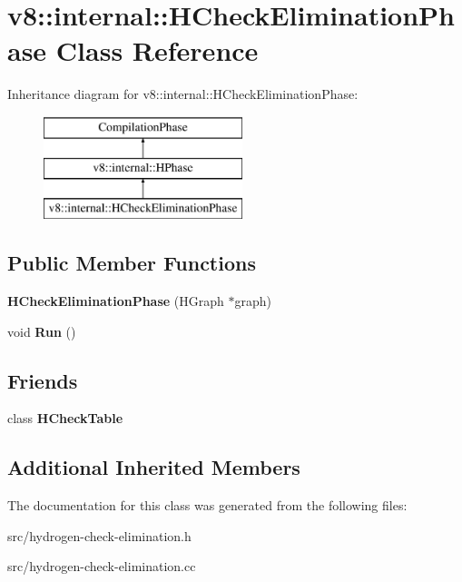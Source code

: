 \hypertarget{classv8_1_1internal_1_1_h_check_elimination_phase}{}\section{v8\+:\+:internal\+:\+:H\+Check\+Elimination\+Phase Class Reference}
\label{classv8_1_1internal_1_1_h_check_elimination_phase}
Inheritance diagram for v8\+:\+:internal\+:\+:H\+Check\+Elimination\+Phase\+:\begin{figure}[H]
\begin{center}
\leavevmode
\includegraphics[height=3.000000cm]{classv8_1_1internal_1_1_h_check_elimination_phase}
\end{center}
\end{figure}
\subsection*{Public Member Functions}
\begin{DoxyCompactItemize}
\item 
\hypertarget{classv8_1_1internal_1_1_h_check_elimination_phase_ad634c6666701fcdb402546f6b4526314}{}{\bfseries H\+Check\+Elimination\+Phase} (H\+Graph $\ast$graph)\label{classv8_1_1internal_1_1_h_check_elimination_phase_ad634c6666701fcdb402546f6b4526314}

\item 
\hypertarget{classv8_1_1internal_1_1_h_check_elimination_phase_a5072143ff4e3fafbe6ab762551e35c3f}{}void {\bfseries Run} ()\label{classv8_1_1internal_1_1_h_check_elimination_phase_a5072143ff4e3fafbe6ab762551e35c3f}

\end{DoxyCompactItemize}
\subsection*{Friends}
\begin{DoxyCompactItemize}
\item 
\hypertarget{classv8_1_1internal_1_1_h_check_elimination_phase_ad1c00a02f5af9d4d62a6dbdc073b9402}{}class {\bfseries H\+Check\+Table}\label{classv8_1_1internal_1_1_h_check_elimination_phase_ad1c00a02f5af9d4d62a6dbdc073b9402}

\end{DoxyCompactItemize}
\subsection*{Additional Inherited Members}


The documentation for this class was generated from the following files\+:\begin{DoxyCompactItemize}
\item 
src/hydrogen-\/check-\/elimination.\+h\item 
src/hydrogen-\/check-\/elimination.\+cc\end{DoxyCompactItemize}
